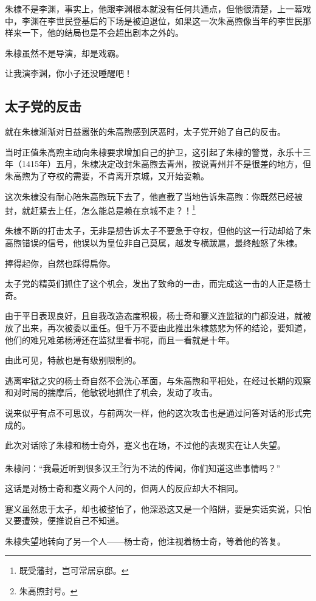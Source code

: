 \begin{multicols}{\theparacolNo}
朱棣不是李渊，事实上，他跟李渊根本就没有任何共通点，但他很清楚，上一幕戏中，李渊在李世民登基后的下场是被迫退位，如果这一次朱高煦像当年的李世民那样来一下，他的结局也是不会超出剧本之外的。

朱棣虽然不是导演，却是戏霸。

让我演李渊，你小子还没睡醒吧！

\subsection{太子党的反击}
就在朱棣渐渐对日益嚣张的朱高煦感到厌恶时，太子党开始了自己的反击。

当时正值朱高煦主动向朱棣要求增加自己的护卫，这引起了朱棣的警觉，永乐十三年（1415年）五月，朱棣决定改封朱高煦去青州，按说青州并不是很差的地方，但朱高煦为了夺权的需要，不肯离开京城，又开始耍赖。

这次朱棣没有耐心陪朱高煦玩下去了，他直截了当地告诉朱高煦：你既然已经被封，就赶紧去上任，怎么能总是赖在京城不走？！\footnote{既受藩封，岂可常居京邸。}

朱棣不断的打击太子，无非是想告诉太子不要急于夺权，但他的这一行动却给了朱高煦错误的信号，他误以为皇位非自己莫属，越发专横跋扈，最终触怒了朱棣。

捧得起你，自然也踩得扁你。

太子党的精英们抓住了这个机会，发出了致命的一击，而完成这一击的人正是杨士奇。

由于平日表现良好，且自我改造态度积极，杨士奇和蹇义连监狱的门都没进，就被放了出来，再次被委以重任。但千万不要由此推出朱棣慈悲为怀的结论，要知道，他们的难兄难弟杨溥还在监狱里看书呢，而且一看就是十年。

由此可见，特赦也是有级别限制的。

逃离牢狱之灾的杨士奇自然不会洗心革面，与朱高煦和平相处，在经过长期的观察和对时局的揣摩后，他敏锐地抓住了机会，发动了攻击。

说来似乎有点不可思议，与前两次一样，他的这次攻击也是通过问答对话的形式完成的。

此次对话除了朱棣和杨士奇外，蹇义也在场，不过他的表现实在让人失望。

朱棣问：“我最近听到很多汉王\footnote{朱高煦封号。}行为不法的传闻，你们知道这些事情吗？”

这话是对杨士奇和蹇义两个人问的，但两人的反应却大不相同。

蹇义虽然忠于太子，却也被整怕了，他深恐这又是一个陷阱，要是实话实说，只怕又要遭殃，便推说自己不知道。

朱棣失望地转向了另一个人——杨士奇，他注视着杨士奇，等着他的答复。


\end{multicols}
